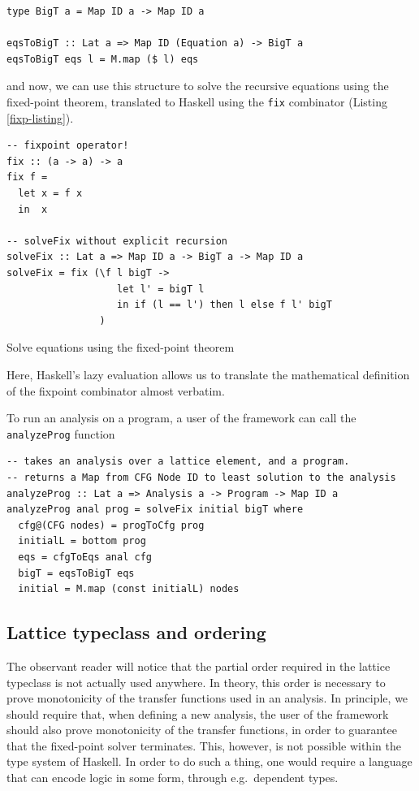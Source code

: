\documentclass{article}
\begin{document}
\begin{verbatim}
type BigT a = Map ID a -> Map ID a

eqsToBigT :: Lat a => Map ID (Equation a) -> BigT a
eqsToBigT eqs l = M.map ($ l) eqs
\end{verbatim}

and now, we can use this structure to solve the recursive equations
using the fixed-point theorem, translated to Haskell using the
\texttt{fix} combinator (Listing \ref{fixp-listing}).

\begin{listing}[H]
\begin{verbatim}
-- fixpoint operator!
fix :: (a -> a) -> a
fix f =
  let x = f x
  in  x

-- solveFix without explicit recursion
solveFix :: Lat a => Map ID a -> BigT a -> Map ID a
solveFix = fix (\f l bigT ->
                   let l' = bigT l
                   in if (l == l') then l else f l' bigT
                )
\end{verbatim}
\caption{Solve equations using the fixed-point theorem}
\label{fixp-listing}
\end{listing}

Here, Haskell's lazy evaluation allows us to translate the mathematical
definition of the fixpoint combinator almost verbatim.

To run an analysis on a program, a user of the framework can call the
\texttt{analyzeProg} function

\begin{verbatim}
-- takes an analysis over a lattice element, and a program.
-- returns a Map from CFG Node ID to least solution to the analysis
analyzeProg :: Lat a => Analysis a -> Program -> Map ID a
analyzeProg anal prog = solveFix initial bigT where
  cfg@(CFG nodes) = progToCfg prog
  initialL = bottom prog
  eqs = cfgToEqs anal cfg
  bigT = eqsToBigT eqs
  initial = M.map (const initialL) nodes
\end{verbatim}

\subsection{Lattice typeclass and
ordering}\label{lattice-typeclass-and-ordering}

The observant reader will notice that the partial order required in the
lattice typeclass is not actually used anywhere. In theory, this order is
necessary to prove monotonicity of the transfer functions used in an
analysis. In principle, we should require that, when defining a new
analysis, the user of the framework should also prove monotonicity of the
transfer functions, in order to guarantee that the fixed-point solver
terminates. This, however, is not possible within the type system of
Haskell. In order to do such a thing, one would require a language that
can encode logic in some form, through e.g.~dependent types.
\end{document}
